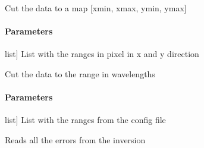 \documentclass[letterpaper,10pt,english]{sphinxmanual}
\begin{document}
\begin{fulllineitems}
\begin{fulllineitems}
\label{\detokenize{classes:id45}}
\pysigstartsignatures
{}
\pysigstopsignatures
\sphinxAtStartPar
Cut the data to a map {[}xmin, xmax, ymin, ymax{]}


\paragraph{Parameters}
\label{\detokenize{classes:id46}}\begin{description}
\sphinxlineitem{Map}{[}list{]}
\sphinxAtStartPar
List with the ranges in pixel in x and y direction

\end{description}

\end{fulllineitems}


\begin{fulllineitems}
\label{\detokenize{classes:id47}}
\pysigstartsignatures
{}
\pysigstopsignatures
\sphinxAtStartPar
Cut the data to the range in wavelengths


\paragraph{Parameters}
\label{\detokenize{classes:id48}}\begin{description}
\sphinxlineitem{range\_wave}{[}list{]}
\sphinxAtStartPar
List with the ranges from the config file

\end{description}

\end{fulllineitems}


\begin{fulllineitems}
\label{\detokenize{classes:id49}}
\pysigstartsignatures
{}
\pysigstopsignatures
\sphinxAtStartPar
Reads all the errors from the inversion



\end{fulllineitems}
\end{fulllineitems}
\end{document}
